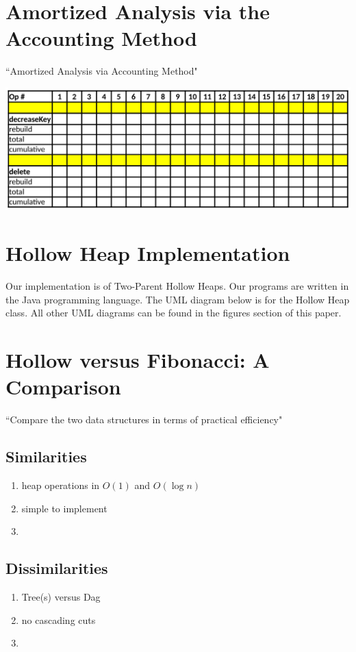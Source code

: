 \documentclass[letter,10pt]{article}
\begin{document}
\section{Amortized Analysis via the Accounting Method}
``Amortized Analysis via Accounting Method"
\begin{center}
	\includegraphics[width=\textwidth]{accounting.png}
\end{center}

\section{Hollow Heap Implementation} 
Our implementation is of Two-Parent Hollow Heaps. Our programs are written in the Java programming language. The UML diagram below is for the Hollow Heap class. All other UML diagrams can be found in the figures section of this paper. 

\section{Hollow versus Fibonacci: A Comparison}
``Compare the two data structures in terms of practical efficiency"
\subsection{Similarities}
\begin{enumerate}
    \item heap operations in $O(1)$ and $O(\log n)$
    \item simple to implement
    \item
\end{enumerate}

\subsection{Dissimilarities}
\begin{enumerate}
    \item Tree(s) versus Dag
    \item no cascading cuts
    \item 
\end{enumerate}
\end{document}
